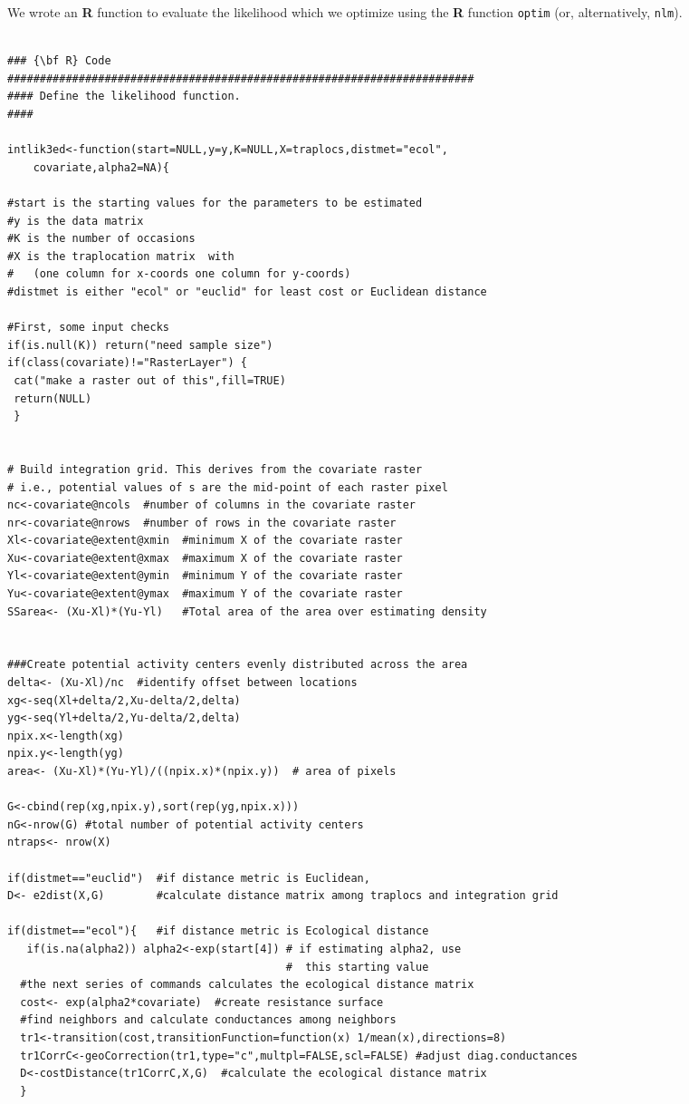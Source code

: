 \documentclass[12pt]{article}
\begin{document}
\begin{spacing}{1.2}
We wrote an {\bf R} function to evaluate the likelihood which we optimize
using the {\bf R} function \mbox{\tt optim} (or, alternatively,
\mbox{\tt nlm}).

{\tiny
\begin{verbatim}

### {\bf R} Code
########################################################################
#### Define the likelihood function.
####
	
intlik3ed<-function(start=NULL,y=y,K=NULL,X=traplocs,distmet="ecol",
    covariate,alpha2=NA){  

#start is the starting values for the parameters to be estimated
#y is the data matrix
#K is the number of occasions
#X is the traplocation matrix  with 
#   (one column for x-coords one column for y-coords)
#distmet is either "ecol" or "euclid" for least cost or Euclidean distance

#First, some input checks
if(is.null(K)) return("need sample size")
if(class(covariate)!="RasterLayer") {
 cat("make a raster out of this",fill=TRUE)
 return(NULL)
 }


# Build integration grid. This derives from the covariate raster
# i.e., potential values of s are the mid-point of each raster pixel
nc<-covariate@ncols  #number of columns in the covariate raster
nr<-covariate@nrows  #number of rows in the covariate raster
Xl<-covariate@extent@xmin  #minimum X of the covariate raster
Xu<-covariate@extent@xmax  #maximum X of the covariate raster
Yl<-covariate@extent@ymin  #minimum Y of the covariate raster
Yu<-covariate@extent@ymax  #maximum Y of the covariate raster
SSarea<- (Xu-Xl)*(Yu-Yl)   #Total area of the area over estimating density


###Create potential activity centers evenly distributed across the area
delta<- (Xu-Xl)/nc  #identify offset between locations
xg<-seq(Xl+delta/2,Xu-delta/2,delta) 
yg<-seq(Yl+delta/2,Yu-delta/2,delta) 
npix.x<-length(xg)
npix.y<-length(yg)
area<- (Xu-Xl)*(Yu-Yl)/((npix.x)*(npix.y))  # area of pixels

G<-cbind(rep(xg,npix.y),sort(rep(yg,npix.x)))
nG<-nrow(G) #total number of potential activity centers 
ntraps<- nrow(X)

if(distmet=="euclid")  #if distance metric is Euclidean,
D<- e2dist(X,G)        #calculate distance matrix among traplocs and integration grid

if(distmet=="ecol"){   #if distance metric is Ecological distance 
   if(is.na(alpha2)) alpha2<-exp(start[4]) # if estimating alpha2, use 
                                           #  this starting value
  #the next series of commands calculates the ecological distance matrix 
  cost<- exp(alpha2*covariate)  #create resistance surface
  #find neighbors and calculate conductances among neighbors
  tr1<-transition(cost,transitionFunction=function(x) 1/mean(x),directions=8)
  tr1CorrC<-geoCorrection(tr1,type="c",multpl=FALSE,scl=FALSE) #adjust diag.conductances
  D<-costDistance(tr1CorrC,X,G)  #calculate the ecological distance matrix
  }


\end{verbatim}}
\end{spacing}
\end{document}
